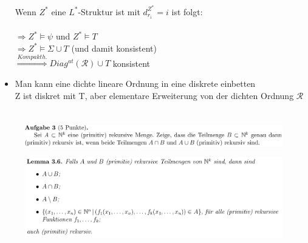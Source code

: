 \documentclass[a4paper]{scrartcl}%
\begin{document}
\begin{itemize}
            \\Wenn $Z^*$ eine $L^*$-Struktur ist mit $d_{r_i}^{Z^*} = i$ ist folgt:\\
            \\$\Rightarrow Z^* \vDash \psi$ und $Z^* \vDash T$\\
            $\Rightarrow Z^* \vDash \Sigma \cup T$ \quad (und damit konsistent)\\
            $\overset{Kompakth.}{\Rightarrow} Diag^{at}(\mathcal{R}) \cup T$ konsistent\\
        \item Man kann eine dichte lineare Ordnung in eine diskrete einbetten\\
            Z ist diskret mit T, aber elementare Erweiterung von der dichten Ordnung $\mathcal{R}$\\
    \end{itemize}

\section*{}%
\label{sec:aufgabe_3}

    \begin{figure}[H]
        \includegraphics[scale=0.3]{./A-3.png}
        \label{fig:}
    \end{figure}

    \begin{figure}[H]
        \centering
        \includegraphics[scale=0.3]{./prim-rek.png}
        \label{fig:./prim-rek}
    \end{figure}
\end{document}
